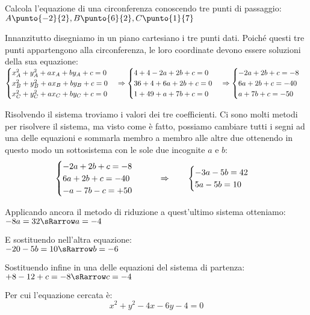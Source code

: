 \begin{esempio}
Calcola l'equazione di una circonferenza conoscendo tre punti di passaggio:
\(A\punto{-2}{2}, B\punto{6}{2}, C\punto{1}{7}\)

\vspace{7pt}

Innanzitutto disegniamo in un piano cartesiano i tre punti dati.
Poiché questi tre punti appartengono alla circonferenza, le loro coordinate 
devono essere soluzioni della sua equazione: \\
\(\begin{cases}x_A^2 +y_A^2 +ax_A +by_A +c = 0 \\
           x_B^2 +y_B^2 +ax_B +by_B +c = 0 \\
           x_C^2 +y_C^2 +ax_C +by_C +c = 0\end{cases} \Rightarrow
  \begin{cases}4 +4 -2a +2b +c = 0 \\
           36 +4 +6a +2b +c = 0 \\
           1 +49 +a +7b +c = 0 \end{cases} \Rightarrow
  \begin{cases}-2a +2b +c = -8 \\
           6a +2b +c = -40 \\
           a +7b +c = -50 \end{cases}\)

\vspace{7pt}
           
Risolvendo il sistema troviamo i valori dei tre coefficienti. Ci sono molti 
metodi per risolvere il sistema, ma visto come è fatto, possiamo cambiare tutti 
i segni ad una delle equazioni e sommarla membro a membro alle altre due 
ottenendo in questo modo un sottosistema con le sole due incognite \(a\) e 
\(b\):
\[\begin{cases}-2a +2b +c = -8 \\
           6a +2b +c = -40 \\
           -a -7b -c = +50 \end{cases} \qquad \Rightarrow \qquad
  \begin{cases}-3a -5b = 42 \\
           5a -5b = 10  \end{cases}\]

Applicando ancora il metodo di riduzione a quest'ultimo sistema otteniamo: \\
\(-8a = 32 \sRarrow a = -4\)

E sostituendo nell'altra equazione: \\
\(-20 -5b = 10 \sRarrow b = -6\)

Sostituendo infine in una delle equazioni del sistema di partenza: \\
\(+8 -12 +c = -8 \sRarrow c = -4\)

Per cui l'equazione cercata è:
\[x^2 +y^2 -4x -6y -4 = 0\]

\end{esempio}

